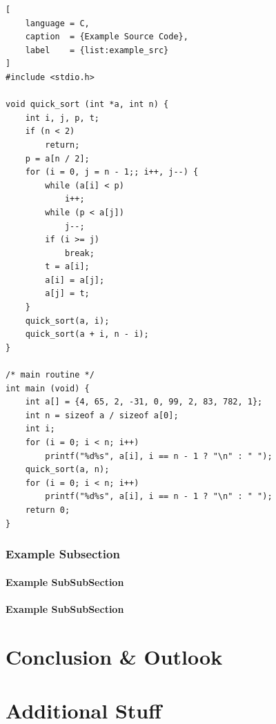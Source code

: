 \documentclass[%
  headings = standardclasses, %
]{tumDiss}
\begin{document}
\begin{lstlisting}[
    language = C,
    caption  = {Example Source Code},
    label    = {list:example_src}
]
#include <stdio.h>

void quick_sort (int *a, int n) {
    int i, j, p, t;
    if (n < 2)
        return;
    p = a[n / 2];
    for (i = 0, j = n - 1;; i++, j--) {
        while (a[i] < p)
            i++;
        while (p < a[j])
            j--;
        if (i >= j)
            break;
        t = a[i];
        a[i] = a[j];
        a[j] = t;
    }
    quick_sort(a, i);
    quick_sort(a + i, n - i);
}

/* main routine */
int main (void) {
    int a[] = {4, 65, 2, -31, 0, 99, 2, 83, 782, 1};
    int n = sizeof a / sizeof a[0];
    int i;
    for (i = 0; i < n; i++)
        printf("%d%s", a[i], i == n - 1 ? "\n" : " ");
    quick_sort(a, n);
    for (i = 0; i < n; i++)
        printf("%d%s", a[i], i == n - 1 ? "\n" : " ");
    return 0;
}
\end{lstlisting}



\subsection{Example Subsection}

\lipsum[1]



\subsubsection{Example SubSubSection}

\lipsum[9]



\subsubsection{Example SubSubSection}

\lipsum[10]



\chapter{Conclusion \& Outlook}
\label{chap:conclusion}

\lipsum[1-4]








\appendix
\chapter{Additional Stuff}

\lipsum[1-4]
\end{document}

